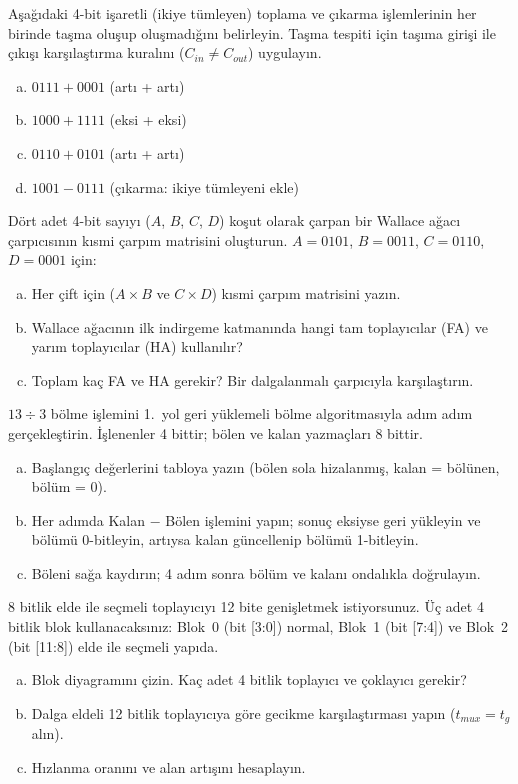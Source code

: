 \begin{alistirma}[\orta]
Aşağıdaki 4-bit işaretli (ikiye tümleyen) toplama ve çıkarma işlemlerinin her birinde taşma oluşup oluşmadığını belirleyin. Taşma tespiti için taşıma girişi ile çıkışı karşılaştırma kuralını ($C_{in} \neq C_{out}$) uygulayın.
\begin{enumerate}[(a)]
\item $0111 + 0001$ (artı + artı)
\item $1000 + 1111$ (eksi + eksi)
\item $0110 + 0101$ (artı + artı)
\item $1001 - 0111$ (çıkarma: ikiye tümleyeni ekle)
\end{enumerate}
\end{alistirma}

\begin{alistirma}[\zor]
Dört adet 4-bit sayıyı ($A$, $B$, $C$, $D$) koşut olarak çarpan bir Wallace ağacı çarpıcısının kısmi çarpım matrisini oluşturun. $A = 0101$, $B = 0011$, $C = 0110$, $D = 0001$ için:
\begin{enumerate}[(a)]
\item Her çift için ($A \times B$ ve $C \times D$) kısmi çarpım matrisini yazın.
\item Wallace ağacının ilk indirgeme katmanında hangi tam toplayıcılar (FA) ve yarım toplayıcılar (HA) kullanılır?
\item Toplam kaç FA ve HA gerekir? Bir dalgalanmalı çarpıcıyla karşılaştırın.
\end{enumerate}
\end{alistirma}

\begin{alistirma}[\orta]
$13 \div 3$ bölme işlemini 1.\ yol geri yüklemeli bölme algoritmasıyla adım adım gerçekleştirin. İşlenenler 4 bittir; bölen ve kalan yazmaçları 8 bittir.
\begin{enumerate}[(a)]
\item Başlangıç değerlerini tabloya yazın (bölen sola hizalanmış, kalan = bölünen, bölüm = 0).
\item Her adımda Kalan $-$ Bölen işlemini yapın; sonuç eksiyse geri yükleyin ve bölümü 0-bitleyin, artıysa kalan güncellenip bölümü 1-bitleyin.
\item Böleni sağa kaydırın; 4 adım sonra bölüm ve kalanı ondalıkla doğrulayın.
\end{enumerate}
\end{alistirma}

\begin{alistirma}[\orta]
8 bitlik elde ile seçmeli toplayıcıyı 12 bite genişletmek istiyorsunuz. Üç adet 4 bitlik blok kullanacaksınız: Blok~0 (bit [3:0]) normal, Blok~1 (bit [7:4]) ve Blok~2 (bit [11:8]) elde ile seçmeli yapıda.
\begin{enumerate}[(a)]
\item Blok diyagramını çizin. Kaç adet 4 bitlik toplayıcı ve çoklayıcı gerekir?
\item Dalga eldeli 12 bitlik toplayıcıya göre gecikme karşılaştırması yapın ($t_{mux} = t_g$ alın).
\item Hızlanma oranını ve alan artışını hesaplayın.
\end{enumerate}
\end{alistirma}


